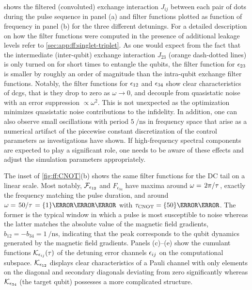  shows the filtered (convoluted) exchange interaction $J_{ij}$ between each pair of dots during the pulse sequence in panel (a) and filter functions plotted as function of frequency in panel (b) for the three different detunings.
For a detailed description on how the filter functions were computed in the presence of additional leakage levels refer to \cref{sec:app:ff:singlet-triplet}.
As one would expect from the fact that the intermediate (inter-qubit) exchange interaction $J_{23}$ (orange dash-dotted lines) is only turned on for short times to entangle the qubits, the filter function for $\epsilon_{23}$ is smaller by roughly an order of magnitude than the intra-qubit exchange filter functions.
Notably, the filter functions for $\epsilon_{12}$ and $\epsilon_{34}$ show clear characteristics of \glspl{dcg}, that is they drop to zero as $\omega\rightarrow 0$, and decouple from quasistatic noise with an error suppression $\propto\omega^2$.
This is not unexpected as the optimization minimizes quasistatic noise contributions to the infidelity.
In addition, one can also observe small oscillations with period $\qty{5}{\per\nano\second}$ in frequency space that arise as a numerical artifact of the piecewise constant discretization of the control parameters as investigations have shown.
If high-frequency spectral components are expected to play a significant role, one needs to be aware of these effects and adjust the simulation parameters appropriately.

The inset of \cref{fig:ff:CNOT}(b) shows the same filter functions for the DC tail on a linear scale.
Most notably, $\mathcal{F}_{\epsilon_{12}}$ and $F_{\epsilon_{34}}$ have maxima around $\omega = \flatfrac{2\pi}{\tau}$, \ie exactly the frequency matching the pulse duration, and around $\omega = \flatfrac{50}{\tau} = \qty{1}{\per\nano\second}$ with $\tau_{\CNOT} = \qty{50}{\nano\second}$.
The former is the typical window in which a pulse is most susceptible to noise whereas the latter matches the absolute value of the magnetic field gradients, $b_{12} = -b_{34} = \qty{1}{\per\nano\second}$, indicating that the peak corresponds to the qubit dynamics generated by the magnetic field gradients.
Panels (c)--(e) show the cumulant functions $\mathcal{K}_{\epsilon_{ij}}(\tau)$ of the detuning error channels $\epsilon_{ij}$ on the computational subspace.
$\mathcal{K}_{\epsilon_{12}}$ displays clear characteristics of a Pauli channel with only elements on the diagonal and secondary diagonals deviating from zero significantly whereas $\mathcal{K}_{\epsilon_{34}}$ (the target qubit) possesses a more complicated structure.

